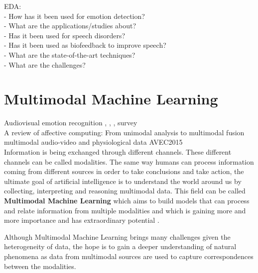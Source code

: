 EDA:\\
-	How has it been used for emotion detection?\\
-	What are the applications/studies about?\\
-	Has it been used for speech disorders?\\
-	Has it been used as biofeedback to improve speech?\\
-	What are the state-of-the-art techniques?\\
-	What are the challenges?\\




\section{Multimodal Machine Learning}

Audiovisual emotion recognition \cite{Chao2016}, \cite{Corneanu2016survey}, \cite{Nicolle2012}, survey \cite{Zeng2009survey}\\

A review of affective computing: From unimodal analysis to multimodal fusion\cite{Poria2017}\\


multimodal audio-video and physiological data AVEC2015 \cite{Ringeval2015}\\


Information is being exchanged through different channels. These different channels can be called modalities. The same way humans can process information coming from different sources in order to take conclusions and take action, the ultimate goal of artificial intelligence is to understand the world around us by collecting, interpreting and reasoning multimodal data. This field can be called \textbf{Multimodal Machine Learning} which aims to build models that can process and relate information from multiple modalities and which is gaining more and more importance and has extraordinary potential \cite{Baltruvsaitis2017multimodal}.

Although Multimodal Machine Learning brings many challenges given the heterogeneity of data, the hope is to gain a deeper understanding of natural phenomena as data from multimodal sources are used to capture correspondences between the modalities.

